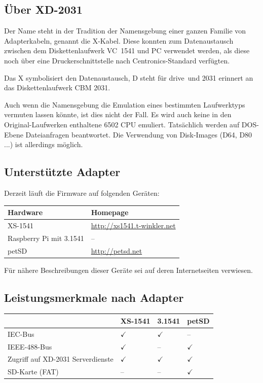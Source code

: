 \documentclass[10pt,a4paper]{scrartcl}		%
\begin{document}
\subsection{Über \glqq XD-2031\grqq}
Der Name steht in der Tradition der Namensgebung einer ganzen Familie
von Adapterkabeln, genannt die X-Kabel. Diese konnten zum 
Datenaustausch zwischen dem Diskettenlaufwerk \mbox{VC 1541} 
und PC verwendet werden, als diese noch über eine
Druckerschnittstelle nach Centronics-Standard verfügten.

Das X symbolisiert den Datenaustausch, D steht für \glqq drive\grqq\ 
und 2031 erinnert an das Diskettenlaufwerk CBM 2031.

Auch wenn die Namensgebung die Emulation eines bestimmten Laufwerktyps
vermuten lassen könnte, ist dies nicht der Fall. Es wird auch keine
in den Original-Laufwerken enthaltene 6502 CPU emuliert.
Tatsächlich werden auf DOS-Ebene Dateianfragen beantwortet. Die
Verwendung von Disk-Images (D64, D80 ...) 
ist allerdings möglich.

\subsection{Unterstützte Adapter}
Derzeit läuft die Firmware auf folgenden Geräten:

\begin{tabular}[c]{l l}
\toprule 
Hardware & Homepage \\
\midrule
XS-1541	& \url{http://xs1541.t-winkler.net} \\
Raspberry Pi mit 3.1541 & -- \\
petSD	& \url{http://petsd.net} \\
\bottomrule
\end{tabular}

Für nähere Beschreibungen dieser Geräte sei auf deren Internetseiten
verwiesen.

\subsection*{Leistungsmerkmale nach Adapter}

\begin{tabular}[c]{l l l l}
\toprule
			& XS-1541	& 3.1541       & petSD		\\
\midrule
IEC-Bus			& $\checkmark$	& $\checkmark$ &  --		\\
IEEE-488-Bus		& $\checkmark$	& --	       & $\checkmark$	\\
Zugriff auf XD-2031 Serverdienste
			& $\checkmark$	& $\checkmark$ & $\checkmark$	\\
SD-Karte (FAT)		& --		& --	       & $\checkmark$	\\
\bottomrule
\end{tabular}
\end{document}
